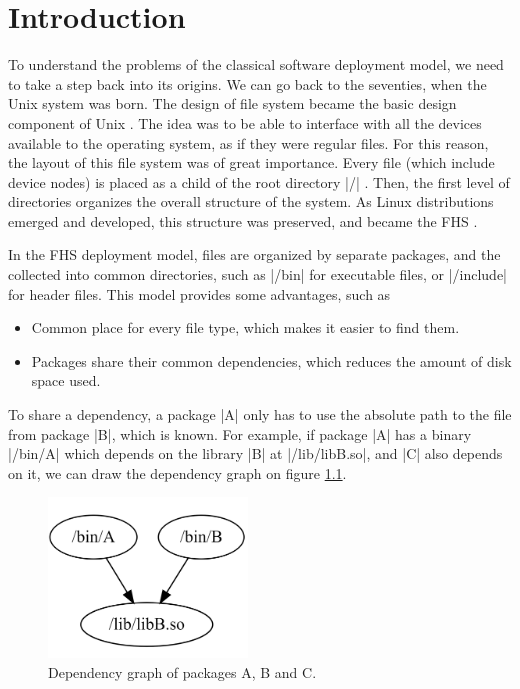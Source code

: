 \chapter{Introduction}


To understand the problems of the classical software deployment model, we need
to take a step back into its origins. We can go back to the seventies, when the
Unix system was born. The design of file system became the basic design
component of Unix  \cite{ritchieUNIXSystemEvolution1984} . The idea was to be able to interface
with all the devices available to the operating system, as if they were regular
files. For this reason, the layout of this file system was of great importance.
Every file (which include device nodes) is placed as a child of the root
directory |/| . Then, the first level of directories organizes the overall
structure of the system. As Linux distributions emerged and developed, this
structure was preserved, and became the \ac{FHS}
\cite{FHSLinuxFoundation}.

In the \ac{FHS} deployment model, files are organized by separate packages, and the
collected into common directories, such as |/bin| for executable files, or
|/include| for header files. This model provides some advantages, such as

\begin{itemize}
    \item Common place for every file type, which makes it easier to
        find them.
    \item Packages share their common dependencies, which reduces the
        amount of disk space used.
\end{itemize}

To share a dependency, a package |A| only has to use the absolute path to the
file from package |B|, which is known. For example, if package |A| has a binary
|/bin/A| which depends on the library |B| at |/lib/libB.so|, and |C| also
depends on it, we can draw the dependency graph on figure \ref{fig:graph1}.

\begin{figure}
    \centering
    \includegraphics[width=150pt]{Screenshot 2023-05-29 150312.png}
    \caption{Dependency graph of packages A, B and C.}
    \label{fig:graph1}
\end{figure}

